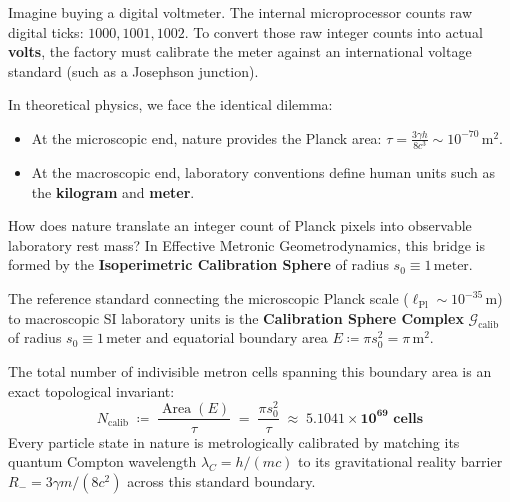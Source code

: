 \documentclass[
    12pt,
    a4paper,
    headings=normal,
    twoside=false,
    open=any,
    parskip=half
]{scrbook}
\begin{document}
\begin{intuitionbox}
Imagine buying a digital voltmeter. The internal microprocessor counts raw digital ticks: $1000, 1001, 1002$. To convert those raw integer counts into actual \textbf{volts}, the factory must calibrate the meter against an international voltage standard (such as a Josephson junction).

In theoretical physics, we face the identical dilemma:
\begin{itemize}[leftmargin=1.5em]
    \item At the microscopic end, nature provides the Planck area: $\tau = \frac{3\gamma h}{8c^3} \sim 10^{-70}\,\text{m}^2$.
    \item At the macroscopic end, laboratory conventions define human units such as the \textbf{kilogram} and \textbf{meter}.
\end{itemize}
How does nature translate an integer count of Planck pixels into observable laboratory rest mass? In Effective Metronic Geometrodynamics, this bridge is formed by the \textbf{Isoperimetric Calibration Sphere} of radius $s_0 \equiv 1\,\text{meter}$.
\end{intuitionbox}

The reference standard connecting the microscopic Planck scale ($\ell_{\text{Pl}} \sim 10^{-35}\,\text{m}$) to macroscopic SI laboratory units is the \textbf{Calibration Sphere Complex} $\mathcal{G}_{\text{calib}}$ of radius $s_0 \equiv 1\,\text{meter}$ and equatorial boundary area $E \coloneqq \pi s_0^2 = \pi\,\text{m}^2$.

The total number of indivisible metron cells spanning this boundary area is an exact topological invariant:
\begin{equation}
N_{\text{calib}} \;\coloneqq\; \frac{\operatorname{Area}(E)}{\tau} \;=\; \frac{\pi s_0^2}{\tau} \;\approx\; \mathbf{5.1041 \times 10^{69} \text{ cells}}
\label{eq:ch5_calibration_cells_count}
\end{equation}
Every particle state in nature is metrologically calibrated by matching its quantum Compton wavelength $\lambda_C = h/(mc)$ to its gravitational reality barrier $R_- = 3\gamma m / (8c^2)$ across this standard boundary.
\end{document}
